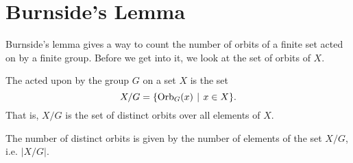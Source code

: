 \section{Burnside's Lemma}
Burnside's lemma gives a way to count the number of orbits of a finite set acted on by a finite group. Before we get into it, we look at the set of orbits of $X$.

\begin{definition}
    The  acted upon by the group $G$ on a set $X$ is the set
    \[
        X / G = \{\Orb{G}{x} \vert x \in X\}.
    \]
    That is, $X/G$ is the set of distinct orbits over all elements of $X$.
\end{definition}
\begin{remark}
    The number of distinct orbits is given by the number of elements of the set $X/G$, i.e. $|X/G|$.
\end{remark}

